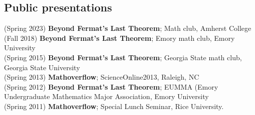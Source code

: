 \documentclass[margin,line]{res}
\begin{document}
\begin{resume}

\section{\sc Public presentations}
(Spring 2023) \textbf{Beyond Fermat's Last Theorem};
Math club, Amherst College
\vspace{.05cm}\\
(Fall 2018) \textbf{Beyond Fermat's Last Theorem};
Emory math club, Emory University
\vspace{.05cm}\\
(Spring 2015) \textbf{Beyond Fermat's Last Theorem};
Georgia State math club, Georgia State University
\vspace{.05cm}\\
(Spring 2013) \textbf{Mathoverflow};
ScienceOnline2013, Raleigh, NC
\vspace{.05cm}\\
(Spring 2012) \textbf{Beyond Fermat's Last Theorem};
EUMMA (Emory Undergraduate Mathematics Major Association, Emory University
\vspace{.05cm}\\
(Spring 2011) \textbf{Mathoverflow};
Special Lunch Seminar, Rice University.
\vspace{.05cm}\\





\end{resume}
\end{document}
